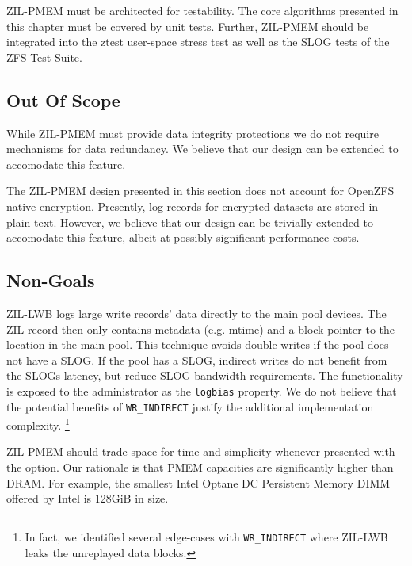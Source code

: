 \documentclass[12pt,a4paper,twoside,draft]{book}
\begin{document}
ZIL-PMEM must be architected for testability.
The core algorithms presented in this chapter must be covered by unit tests.
Further, ZIL-PMEM should be integrated into the ztest user-space stress test as well as the SLOG tests of the ZFS Test Suite.

\subsection{Out Of Scope}

While ZIL-PMEM must provide data integrity protections we do not require mechanisms for data redundancy.
We believe that our design can be extended to accomodate this feature.

The ZIL-PMEM design presented in this section does not account for OpenZFS native encryption.
Presently, log records for encrypted datasets are stored in plain text.
However, we believe that our design can be trivially extended to accomodate this feature, albeit at possibly significant performance costs.

\subsection{Non-Goals}

ZIL-LWB logs large write records' data directly to the main pool devices.
The ZIL record then only contains metadata (e.g. mtime) and a block pointer to the location in the main pool.
This technique avoids double-writes if the pool does not have a SLOG.
If the pool has a SLOG, indirect writes do not benefit from the SLOGs latency, but reduce SLOG bandwidth requirements.
The functionality is exposed to the administrator as the \lstinline{logbias} property.
We do not believe that the potential benefits of \lstinline{WR_INDIRECT} justify the additional implementation complexity.
\footnote{In fact, we identified several edge-cases with \lstinline{WR_INDIRECT} where ZIL-LWB leaks the unreplayed data blocks.\cite{zil_lwb_block_leak_edge_case}} %


ZIL-PMEM should trade space for time and simplicity whenever presented with the option.
Our rationale is that PMEM capacities are significantly higher than DRAM.
For example, the smallest Intel Optane DC Persistent Memory DIMM offered by Intel is 128GiB in size.\cite{optanepricing_missing}
\end{document}
